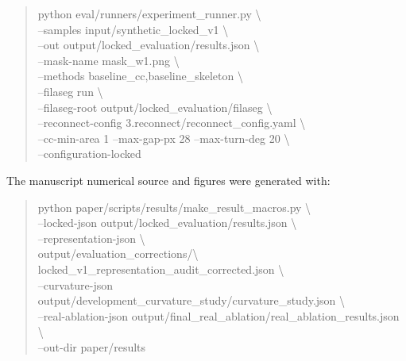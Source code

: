 \begin{quote}\small\ttfamily
python eval/runners/experiment\_runner.py \textbackslash\\
\hspace*{1em}--samples input/synthetic\_locked\_v1 \textbackslash\\
\hspace*{1em}--out output/locked\_evaluation/results.json \textbackslash\\
\hspace*{1em}--mask-name mask\_w1.png \textbackslash\\
\hspace*{1em}--methods baseline\_cc,baseline\_skeleton \textbackslash\\
\hspace*{1em}--filaseg run \textbackslash\\
\hspace*{1em}--filaseg-root output/locked\_evaluation/filaseg \textbackslash\\
\hspace*{1em}--reconnect-config 3.reconnect/reconnect\_config.yaml \textbackslash\\
\hspace*{1em}--cc-min-area 1 --max-gap-px 28 --max-turn-deg 20
\textbackslash\\
\hspace*{1em}--configuration-locked
\end{quote}

The manuscript numerical source and figures were generated with:

\begin{quote}\footnotesize\ttfamily
python paper/scripts/results/make\_result\_macros.py \textbackslash\\
\hspace*{1em}--locked-json output/locked\_evaluation/results.json
\textbackslash\\
\hspace*{1em}--representation-json \textbackslash\\
\hspace*{2em}output/evaluation\_corrections/\textbackslash\\
\hspace*{2em}locked\_v1\_representation\_audit\_corrected.json
\textbackslash\\
\hspace*{1em}--curvature-json
output/development\_curvature\_study/curvature\_study.json \textbackslash\\
\hspace*{1em}--real-ablation-json
output/final\_real\_ablation/real\_ablation\_results.json
\textbackslash\\
\hspace*{1em}--out-dir paper/results
\end{quote}

